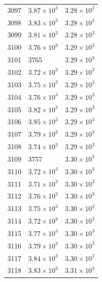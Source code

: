 \begin{table}[H]
\begin{tabular}{lll}
3097 & $\displaystyle 3.87 \times 10^{3}$ & $\displaystyle 3.28 \times 10^{3}$ \\
3098 & $\displaystyle 3.83 \times 10^{3}$ & $\displaystyle 3.28 \times 10^{3}$ \\
3099 & $\displaystyle 3.81 \times 10^{3}$ & $\displaystyle 3.28 \times 10^{3}$ \\
3100 & $\displaystyle 3.76 \times 10^{3}$ & $\displaystyle 3.29 \times 10^{3}$ \\
3101 & 3765 & $\displaystyle 3.29 \times 10^{3}$ \\
3102 & $\displaystyle 3.72 \times 10^{3}$ & $\displaystyle 3.29 \times 10^{3}$ \\
3103 & $\displaystyle 3.75 \times 10^{3}$ & $\displaystyle 3.29 \times 10^{3}$ \\
3104 & $\displaystyle 3.76 \times 10^{3}$ & $\displaystyle 3.29 \times 10^{3}$ \\
3105 & $\displaystyle 3.82 \times 10^{3}$ & $\displaystyle 3.29 \times 10^{3}$ \\
3106 & $\displaystyle 3.85 \times 10^{3}$ & $\displaystyle 3.29 \times 10^{3}$ \\
3107 & $\displaystyle 3.79 \times 10^{3}$ & $\displaystyle 3.29 \times 10^{3}$ \\
3108 & $\displaystyle 3.74 \times 10^{3}$ & $\displaystyle 3.29 \times 10^{3}$ \\
3109 & 3757 & $\displaystyle 3.30 \times 10^{3}$ \\
3110 & $\displaystyle 3.72 \times 10^{3}$ & $\displaystyle 3.30 \times 10^{3}$ \\
3111 & $\displaystyle 3.71 \times 10^{3}$ & $\displaystyle 3.30 \times 10^{3}$ \\
3112 & $\displaystyle 3.76 \times 10^{3}$ & $\displaystyle 3.30 \times 10^{3}$ \\
3113 & $\displaystyle 3.75 \times 10^{3}$ & $\displaystyle 3.30 \times 10^{3}$ \\
3114 & $\displaystyle 3.72 \times 10^{3}$ & $\displaystyle 3.30 \times 10^{3}$ \\
3115 & $\displaystyle 3.77 \times 10^{3}$ & $\displaystyle 3.30 \times 10^{3}$ \\
3116 & $\displaystyle 3.79 \times 10^{3}$ & $\displaystyle 3.30 \times 10^{3}$ \\
3117 & $\displaystyle 3.84 \times 10^{3}$ & $\displaystyle 3.30 \times 10^{3}$ \\
3118 & $\displaystyle 3.83 \times 10^{3}$ & $\displaystyle 3.31 \times 10^{3}$ \\

\end{tabular}
\end{table}
